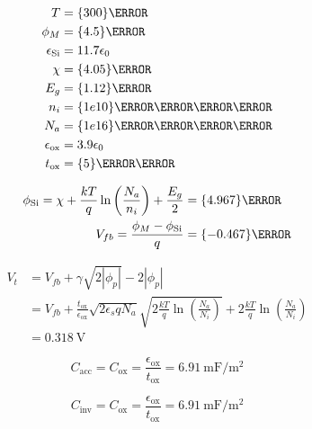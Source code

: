 \documentclass{article}
\begin{document}
\maketitle

\question{}




\question{}

\begin{align}
  T &= \qty{300}{\kelvin} \\
  \phi_{M} &= \qty{4.5}{\electronvolt} \\
  \epsilon_{\ce{Si}} &= 11.7\epsilon_{0} \\
  \chi &= \qty{4.05}{\electronvolt} \\
  E_{g} &= \qty{1.12}{\electronvolt} \\
  n_{i} &= \qty{1e10}{\per\centi\meter\cubed} \\
  N_{a} &= \qty{1e16}{\per\centi\meter\cubed} \\
  \epsilon_{\text{ox}} &= 3.9\epsilon_{0} \\
  t_{\text{ox}} &= \qty{5}{\nano\meter} \\
\end{align}

\begin{subparts}
  \item
  \begin{align}
    \phi_{\ce{Si}} = \chi + \frac{kT}{q} \ln\left(\frac{N_{a}}{n_{i}}\right) + \frac{E_{g}}{2} &= \qty{4.967}{\electronvolt} \\
    V_{fb} = \frac{\phi_{M} - \phi_{\ce{Si}}}{q} &= \qty{-0.467}{\volt}
  \end{align}
  \item
  \begin{align}
    V_{t} &= V_{fb} + \gamma \sqrt{2 |\phi_{p}|} - 2|\phi_{p}| \\
          &= V_{fb} + \frac{t_{\text{ox}}}{\epsilon_{\text{ox}}} \sqrt{2 \epsilon_{s} q N_{a}} \sqrt{2 \frac{kT}{q} \ln\left(\frac{N_{a}}{N_{i}}\right)} + 2 \frac{kT}{q} \ln\left(\frac{N_{a}}{N_{i}}\right) \\
    &= \qty{0.318}{\volt}
  \end{align}
  \item
  \begin{equation}
    C_{\text{acc}} = C_{\text{ox}} = \frac{\epsilon_{\text{ox}}}{t_{\text{ox}}} = \qty{6.91}{\milli\farad\per\meter\squared}
  \end{equation}
  \item
  \begin{equation}
    C_{\text{inv}} = C_{\text{ox}} = \frac{\epsilon_{\text{ox}}}{t_{\text{ox}}} = \qty{6.91}{\milli\farad\per\meter\squared}
  \end{equation}
  \item
  
\end{subparts}
\end{document}
